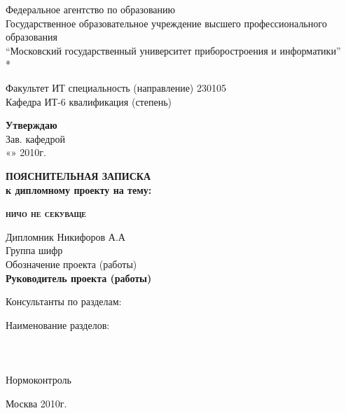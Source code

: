 \begin{titlepage}
\newpage

\begin{center}
Федеральное агентство по образованию \\
\vspace{1cm}
\small{Государственное образовательное учреждение высшего профессионального образования} \\
\normalsize{“Московский государственный университет приборостроения и информатики”} \\*
\end{center}

\begin{center}
Факультет ИТ  специальность (направление) 230105 \\
Кафедра ИТ-6  квалификация (степень) \\
\end{center}

\begin{flushright}
\textbf{Утверждаю} \\
Зав. кафедрой \\ 
«»       2010г.
\end{flushright}

\vfill

\begin{center}
\textbf{\Large ПОЯСНИТЕЛЬНАЯ ЗАПИСКА \\
к дипломному проекту на тему: }
\end{center}

\vfill\vfill

\begin{center}
\textsc{\textbf{ничо не секу\linebreak ваще}}
\end{center}

\vfill\vfill

\begin{flushleft}
Дипломник \hrulefill Никифоров А.А \\
Группа \hrulefill   шифр \hrulefill \\
Обозначение проекта (работы) \hrulefill \\
\vfill
\textbf{Руководитель проекта (работы) \hrulefill}
\vfill
\begin{center}
Консультанты по разделам:
\end{center}
Наименование разделов: \\
\hrulefill \\
\hrulefill \\
\hrulefill \\
Нормоконтроль \hrulefill \\
\end{flushleft}

\vspace{\fill}

\begin{center}
Москва 2010г.
\end{center}

\end{titlepage}
